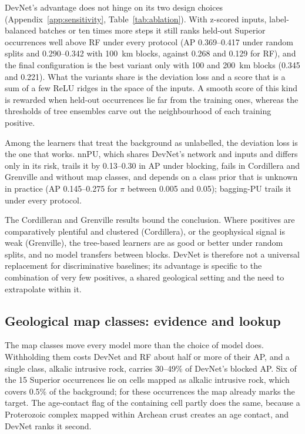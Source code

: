 \documentclass[pdflatex,sn-apa]{sn-jnl}
\begin{document}
DevNet's advantage does not hinge on its two design choices (Appendix~\ref{app:sensitivity}, Table~\ref{tab:ablation}). With z-scored inputs, label-balanced batches or ten times more steps it still ranks held-out Superior occurrences well above RF under every protocol (AP 0.369--0.417 under random splits and 0.290--0.342 with 100~km blocks, against 0.268 and 0.129 for RF), and the final configuration is the best variant only with 100 and 200~km blocks (0.345 and 0.221). What the variants share is the deviation loss and a score that is a sum of a few ReLU ridges in the space of the inputs. A smooth score of this kind is rewarded when held-out occurrences lie far from the training ones, whereas the thresholds of tree ensembles carve out the neighbourhood of each training positive.

Among the learners that treat the background as unlabelled, the deviation loss is the one that works. nnPU, which shares DevNet's network and inputs and differs only in its risk, trails it by 0.13--0.30 in AP under blocking, fails in Cordillera and Grenville and without map classes, and depends on a class prior that is unknown in practice (AP 0.145--0.275 for $\pi$ between 0.005 and 0.05); bagging-PU trails it under every protocol.

The Cordilleran and Grenville results bound the conclusion. Where positives are comparatively plentiful and clustered (Cordillera), or the geophysical signal is weak (Grenville), the tree-based learners are as good or better under random splits, and no model transfers between blocks. DevNet is therefore not a universal replacement for discriminative baselines; its advantage is specific to the combination of very few positives, a shared geological setting and the need to extrapolate within it.

\subsection{Geological map classes: evidence and lookup}\label{sec:disc-mapclasses}

The map classes move every model more than the choice of model does. Withholding them costs DevNet and RF about half or more of their AP, and a single class, alkalic intrusive rock, carries 30--49\% of DevNet's blocked AP. Six of the 15 Superior occurrences lie on cells mapped as alkalic intrusive rock, which covers 0.5\% of the background; for these occurrences the map already marks the target. The age-contact flag of the containing cell partly does the same, because a Proterozoic complex mapped within Archean crust creates an age contact, and DevNet ranks it second.
\end{document}
